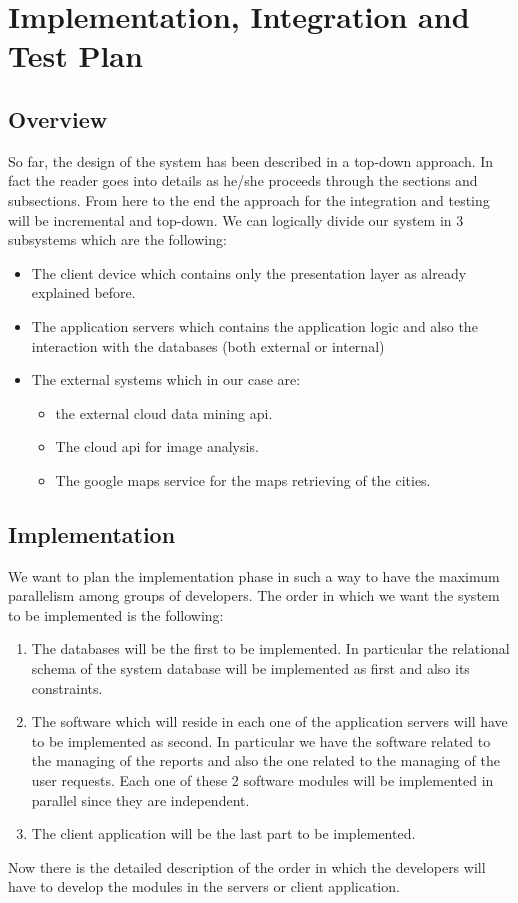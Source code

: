 \documentclass[titlepage]{article}
\begin{document}
\section{Implementation, Integration and Test Plan}
\subsection{Overview}
So far, the design of the system has been described in a top-down approach. In fact the reader goes into details as he/she proceeds through the sections and subsections. From here to the end the approach for the integration and testing will be incremental and top-down. We can logically divide our system in 3 subsystems which are the following:

\begin{itemize}
	\item The client device which contains only the presentation layer as already explained before.
	\item The application servers which contains the application logic and also the interaction with the databases (both external or internal)
	\item The external systems which in our case are:
	\begin{itemize}
		\item the external  cloud data mining api.
		\item The cloud api for image analysis.
		\item The google maps service for the maps retrieving of the cities.
	\end{itemize}
\end{itemize} 

\subsection{Implementation}
We want to plan the implementation phase in such a way to have the maximum parallelism among groups of developers.
The order in which we want the system to be implemented is the following:

\begin{enumerate}

	\item The databases will be the first to be implemented. In particular the relational schema of the system database will be implemented as first and also its constraints.
	\item The software which will reside in each one of the application servers will have to be implemented as second. In particular we have the software related to the managing of the reports and also the one related to the managing of the user requests. Each one of these 2 software modules will be implemented in parallel since they are independent.
	\item The client application will be the last part to be implemented.\\
		
\end{enumerate}
Now there is the detailed description of the order in which the developers will have to develop the modules in the servers or client application.
	
\end{document}
